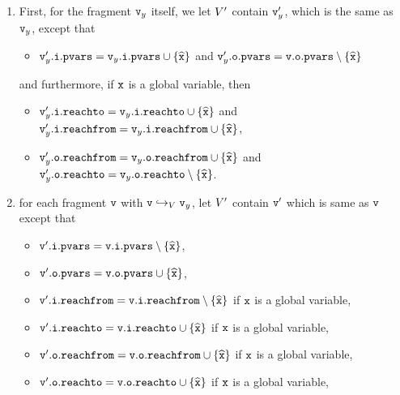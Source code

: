 \begin{enumerate}
\item
First, for the fragment $\mathtt{v}_y$ itself, we let $V'$ contain
$\mathtt{v}_y'$, which is the same as $\mathtt{v}_y$, except that
\begin{itemize}
\item $\mathtt{v}_y'.\mathtt{i}.\mathtt{pvars} = \mathtt{v}_y.\mathtt{i}.\mathtt{pvars} \cup \left\{\widehat{\mathtt{x}}\right\}$ and
  $\mathtt{v}_y'.\mathtt{o}.\mathtt{pvars} = \mathtt{v}.\mathtt{o}.\mathtt{pvars} \setminus \left\{\widehat{\mathtt{x}}\right\}$
\end{itemize}
and furthermore, if $\mathtt{x}$ is a global variable, then
{\small
  \begin{itemize}
\item $\mathtt{v}_y'.\mathtt{i}.\mathtt{reachto} = \mathtt{v}_y.\mathtt{i}.\mathtt{reachto} \cup \left\{\widehat{\mathtt{x}}\right\}$ and
$\mathtt{v}_y'.\mathtt{i}.\mathtt{reachfrom} = \mathtt{v}_y.\mathtt{i}.\mathtt{reachfrom} \cup \left\{\widehat{\mathtt{x}}\right\}$,
\item $\mathtt{v}_y'.\mathtt{o}.\mathtt{reachfrom} = \mathtt{v}_y.\mathtt{o}.\mathtt{reachfrom} \cup \left\{\widehat{\mathtt{x}}\right\}$ and
$\mathtt{v}_y'.\mathtt{o}.\mathtt{reachto} = \mathtt{v}_y.\mathtt{o}.\mathtt{reachto} \setminus \left\{\widehat{\mathtt{x}}\right\}$.
\end{itemize}
}
\item  for each fragment $\mathtt{v}$ with $\mathtt{v} \hookrightarrow_{V} \mathtt{v}_y$, let $V'$ contain $\mathtt{v}'$ which is same as $\mathtt{v}$ except that
\begin{itemize}
\item $\mathtt{v}'.\mathtt{i}.\mathtt{pvars} = \mathtt{v}.\mathtt{i}.\mathtt{pvars} \setminus \left\{\widehat{\mathtt{x}}\right\}$,
\item $\mathtt{v}'.\mathtt{o}.\mathtt{pvars} = \mathtt{v}.\mathtt{o}.\mathtt{pvars} \cup \left\{\widehat{\mathtt{x}}\right\}$,
\item $\mathtt{v}'.\mathtt{i}.\mathtt{reachfrom} = \mathtt{v}.\mathtt{i}.\mathtt{reachfrom} \setminus \left\{\widehat{\mathtt{x}}\right\}$ if $\tt x$ is a global variable,
\item $\mathtt{v}'.\mathtt{i}.\mathtt{reachto} = \mathtt{v}.\mathtt{i}.\mathtt{reachto} \cup \left\{\widehat{\mathtt{x}}\right\}$ if $\tt x$ is a global variable,
 \item $\mathtt{v}'.\mathtt{o}.\mathtt{reachfrom} = \mathtt{v}.\mathtt{o}.\mathtt{reachfrom} \cup \left\{\widehat{\mathtt{x}}\right\}$ if $\tt x$ is a global variable,
\item $\mathtt{v}'.\mathtt{o}.\mathtt{reachto} = \mathtt{v}.\mathtt{o}.\mathtt{reachto} \cup \left\{\widehat{\mathtt{x}}\right\}$ if $\tt x$ is a global variable,

\end{itemize}
\end{enumerate}
